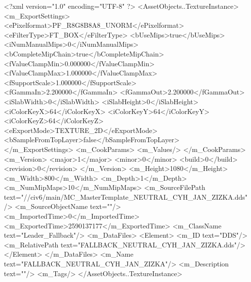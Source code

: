 <?xml version="1.0" encoding="UTF-8" ?>
<AssetObjects..TextureInstance>
	<m_ExportSettings>
		<ePixelformat>PF_R8G8B8A8_UNORM</ePixelformat>
		<eFilterType>FT_BOX</eFilterType>
		<bUseMips>true</bUseMips>
		<iNumManualMips>0</iNumManualMips>
		<bCompleteMipChain>true</bCompleteMipChain>
		<fValueClampMin>0.000000</fValueClampMin>
		<fValueClampMax>1.000000</fValueClampMax>
		<fSupportScale>1.000000</fSupportScale>
		<fGammaIn>2.200000</fGammaIn>
		<fGammaOut>2.200000</fGammaOut>
		<iSlabWidth>0</iSlabWidth>
		<iSlabHeight>0</iSlabHeight>
		<iColorKeyX>64</iColorKeyX>
		<iColorKeyY>64</iColorKeyY>
		<iColorKeyZ>64</iColorKeyZ>
		<eExportMode>TEXTURE_2D</eExportMode>
		<bSampleFromTopLayer>false</bSampleFromTopLayer>
	</m_ExportSettings>
	<m_CookParams>
		<m_Values/>
	</m_CookParams>
	<m_Version>
		<major>1</major>
		<minor>0</minor>
		<build>0</build>
		<revision>0</revision>
	</m_Version>
	<m_Height>1080</m_Height>
	<m_Width>800</m_Width>
	<m_Depth>1</m_Depth>
	<m_NumMipMaps>10</m_NumMipMaps>
	<m_SourceFilePath text="//civ6/main/MC_MasterTemplate\Textures\FALLBACK_NEUTRAL_CYH_JAN_ZIZKA.dds"/>
	<m_SourceObjectName text=""/>
	<m_ImportedTime>0</m_ImportedTime>
	<m_ExportedTime>2590137177</m_ExportedTime>
	<m_ClassName text="Leader_Fallback"/>
	<m_DataFiles>
		<Element>
			<m_ID text="DDS"/>
			<m_RelativePath text="FALLBACK_NEUTRAL_CYH_JAN_ZIZKA.dds"/>
		</Element>
	</m_DataFiles>
	<m_Name text="FALLBACK_NEUTRAL_CYH_JAN_ZIZKA"/>
	<m_Description text=""/>
	<m_Tags/>
</AssetObjects..TextureInstance>

